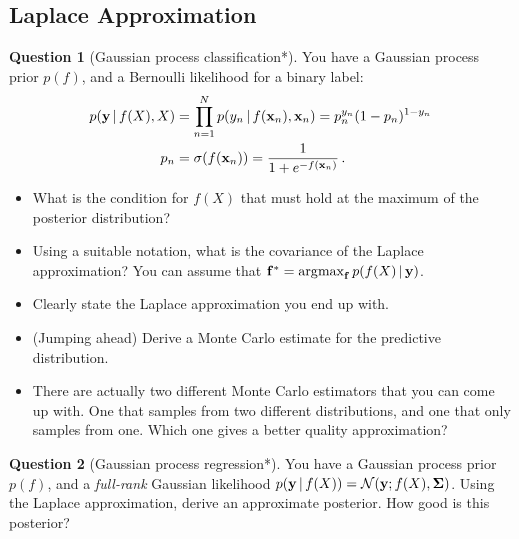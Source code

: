 \documentclass[a4paper]{article}
\newcommand{\mat}[1]{{\boldsymbol{{#1}}}} %
\theoremstyle{definition}
\newtheorem{question}{Question}
\begin{document}
\subsection{Laplace Approximation}
\begin{question}[Gaussian process classification*]
\label{q:laplace-gpc}
You have a Gaussian process prior $p(f)$, and a Bernoulli likelihood for a binary label:
\begin{align}
p(\mathbf{y}\,|\, f(X), X) &= \prod_{n=1}^N p(y_n\,|\, f(\mathbf{x}_n), \mathbf{x}_n) = p_n^{y_n}(1-p_n)^{1 - y_n} \\
p_n &= \sigma(f(\mathbf{x}_n)) = \frac{1}{1 + e^{-f(\mathbf{x}_n)}} \,.
\end{align}
\begin{itemize}
\item What is the condition for $f(X)$ that must hold at the maximum of the posterior distribution?
\item Using a suitable notation, what is the covariance of the Laplace approximation? You can assume that $\mathbf{f}^* = \operatorname*{\arg\!\max}_{\mathbf{f}} p(f(X)\,|\, \mathbf{y})$.
\item Clearly state the Laplace approximation you end up with.
\item (Jumping ahead) Derive a Monte Carlo estimate for the predictive distribution.
\item There are actually two different Monte Carlo estimators that you can come up with. One that samples from two different distributions, and one that only samples from one. Which one gives a better quality approximation?
\end{itemize}
\end{question}


\begin{question}[Gaussian process regression*]
\label{q:laplace-gpr}
You have a Gaussian process prior $p(f)$, and a \emph{full-rank} Gaussian likelihood $p(\vy\given f(X)) = \NormDist{\vy; f(X), \mat \Sigma}$. Using the Laplace approximation, derive an approximate posterior. How good is this posterior?
\end{question}
\end{document}
